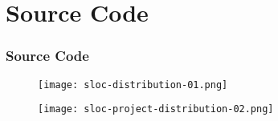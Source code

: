 \section{Source Code}

\begin{frame}[allowframebreaks]
\frametitle{Source Code}

\begin{center}
  \begin{figure}
    \texttt{[image: sloc-distribution-01.png]}
  \end{figure}
\end{center}

\begin{center}
  \begin{figure}
    \texttt{[image: sloc-project-distribution-02.png]}
  \end{figure}
\end{center}


\end{frame}
